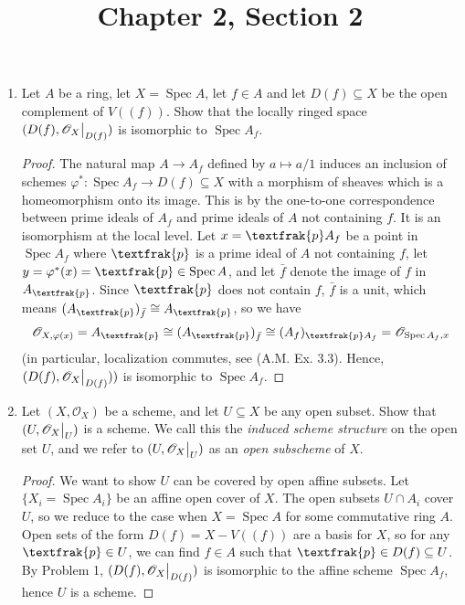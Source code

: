 \documentclass{article}
\title{Chapter 2, Section 2}
\newcommand{\goth}[1]{\textfrak{#1}}
\newcommand{\fO}{\mathscr{O}}
\DeclareMathOperator{\spec}{Spec}
\newcommand\restr[2]{{%
  \left.\kern-\nulldelimiterspace %
  #1 %
  \vphantom{\big|} %
  \right|_{#2} %
}}
\begin{document}
\maketitle
\begin{enumerate} [label=\textbf{\arabic*.}, leftmargin=0em]

\item Let $A$ be a ring, let $X = \spec{A}$, let $f \in A$ and let $D(f) \subseteq X$ be the open complement of $V((f))$. Show that the locally ringed space $(D(f), \restr{\fO_X}{D(f)})$ is isomorphic to $\spec{A_f}$.

\begin{proof}
    The natural map $A \to A_f$ defined by $a \mapsto a / 1$ induces an inclusion of schemes $\varphi ^* : \spec{A_f} \to D(f) \subseteq X$ with a morphism of sheaves which is a homeomorphism onto its image. This is by the one-to-one correspondence between prime ideals of $A_f$ and prime ideals of $A$ not containing $f$. It is an isomorphism at the local level. Let $x = \goth{p}A_f$ be a point in $\spec{A_f}$ where $\goth{p}$ is a prime ideal of $A$ not containing $f$, let $y = \varphi^*(x) = \goth{p} \in \spec{A}$, and let $\bar{f}$ denote the image of $f$ in $A_\goth{p}$. Since $\goth{p}$ does not contain $f$, $\bar{f}$ is a unit, which means $(A_\goth{p})_{\bar{f}} \cong A_\goth{p}$, so we have
    \begin{equation*}
        \fO_{X, \varphi(x)} = A_\goth{p} \cong (A_\goth{p})_{\bar{f}} \cong (A_f)_{\goth{p}A_f} = \fO_{\spec{A_f}, x}
    \end{equation*}
    (in particular, localization commutes, see (A.M. Ex. 3.3). Hence, $(D(f), \restr{\fO_X}{D(f)}))$ is isomorphic to $\spec{A_f}$.
\end{proof}

\item Let $(X, \fO_X)$ be a scheme, and let $U \subseteq X$ be any open subset. Show that $(U, \restr{\fO_X}{U})$ is a scheme. We call this the \textit{induced scheme structure} on the open set $U$, and we refer to $(U, \restr{\fO_X}{U})$ as an \textit{open subscheme} of $X$.

\begin{proof}
    We want to show $U$ can be covered by open affine subsets. Let $\{ X_i = \spec{A_i} \}$ be an affine open cover of $X$. The open subsets $U \cap A_i$ cover $U$, so we reduce to the case when $X = \spec{A}$ for some commutative ring $A$. Open sets of the form $D(f) = X - V((f))$ are a basis for $X$, so for any $\goth{p} \in U$, we can find $f \in A$ such that $\goth{p} \in D(f) \subseteq U$. By Problem 1, $(D(f), \restr{\fO_X}{D(f)})$ is isomorphic to the affine scheme $\spec{A_f}$, hence $U$ is a scheme.
\end{proof}


\end{enumerate}
\end{document}
